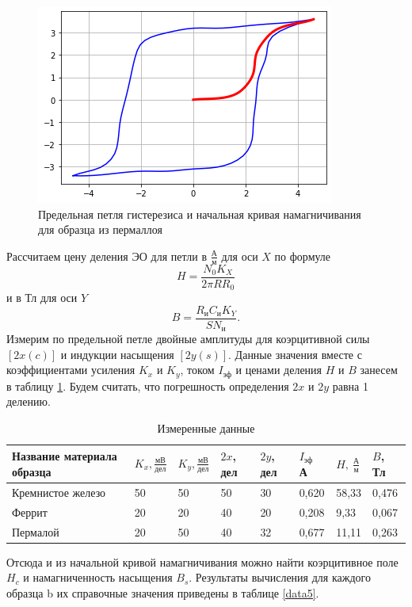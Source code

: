 \documentclass[a4paper,10pt]{article}
\begin{document}
\begin{figure}[h!]
	\centering
	\includegraphics[scale=0.8]{lab345ris5.png}
	\caption{Предельная петля гистерезиса и начальная кривая намагничивания для образца из пермаллоя} \label{Loop_3}
\end{figure}

Рассчитаем цену деления ЭО для петли в $\frac{\text{А}}{\text{м}}$ для оси $X$ по формуле\[H=\frac{N_0K_X}{2\pi RR_0}\]и в $\text{Тл}$ для оси $Y$ \[B=\frac{R_{\text{и}}C_{\text{и}}K_Y}{SN_{\text{и}}}.\]Измерим по предельной петле двойные амплитуды для коэрцитивной силы $\left[2x\left(c\right)\right]$ и индукции насыщения $\left[2y\left(s\right)\right]$. Данные значения вместе с коэффициентами усиления $K_x$ и $K_y$, током $I_{\text{эф}}$ и ценами деления $H$ и $B$ занесем в таблицу \ref{data1}.
Будем считать, что погрешность определения $2x$ и $2y$ равна 1 делению.

\begin{table}[h!]
	\centering
	\caption{Измеренные данные} \label{data1}
	\begin{tabular}{|l|l|l|l|l|l|l|l|}
		\hline
		Название материала образца & $K_x, \frac{\text{мВ}}{\text{дел}}$  & $K_y,\frac{\text{мВ}}{\text{дел}}$ & $2x$, дел & $2y$, дел & $I_{\text{эф}}$ А & $H,\ \frac{\text{А}}{\text{м}}$ & $B$, Тл \\ \hline
		Кремнистое железо          & 50 & 50 & 50 & 30 & 0,620 & 58,33 & 0,476 \\ \hline
		Феррит                     & 20 & 20 & 40 & 20 & 0,208 & 9,33 & 0,067 \\ \hline
		Пермалой                   & 20 & 50 & 40 & 32 & 0,677 & 11,11 & 0,263 \\ \hline
	\end{tabular}
\end{table}

Отсюда и из начальной кривой намагничивания можно найти коэрцитивное поле $H_c$ и намагниченность насыщения $B_s$. Результаты вычисления для каждого образца b их справочные значения приведены в таблице \ref{data5}.
\end{document}
